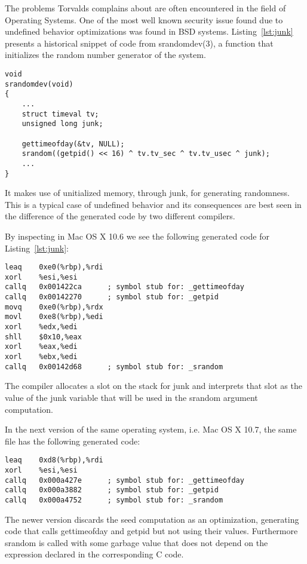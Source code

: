 The problems Torvalds complains about are often encountered in the field
of Operating Systems. One of the most well known security issue found
due to undefined behavior optimizations was found in BSD systems.
Listing~\ref{lst:junk} presents a historical snippet of code from
srandomdev(3), a function that initializes the random number generator
of the system.

\begin{lstlisting}[style=Cstyle, caption={srandom function in
lib/libc/stdlib/random.c on BSD systems}, label={lst:junk}]
void
srandomdev(void)
{
	...
	struct timeval tv;
	unsigned long junk;

	gettimeofday(&tv, NULL);
	srandom((getpid() << 16) ^ tv.tv_sec ^ tv.tv_usec ^ junk);
	...
}
\end{lstlisting}

It makes use of unitialized memory, through junk, for generating
randomness. This is a typical case of undefined behavior and its
consequences are best seen in the difference of the generated code by
two different compilers.

By inspecting  in Mac OS X 10.6 we see
the following generated code for Listing~\ref{lst:junk}:
\begin{lstlisting}[style=Cstyle, caption={}, label={lst:junk}]
leaq    0xe0(%rbp),%rdi
xorl    %esi,%esi
callq   0x001422ca      ; symbol stub for: _gettimeofday
callq   0x00142270      ; symbol stub for: _getpid
movq    0xe0(%rbp),%rdx
movl    0xe8(%rbp),%edi
xorl    %edx,%edi
shll    $0x10,%eax
xorl    %eax,%edi
xorl    %ebx,%edi
callq   0x00142d68      ; symbol stub for: _srandom
\end{lstlisting}

The compiler allocates a slot on the stack for junk and interprets that
slot as the value of the junk variable that will be used in the srandom
argument computation. 

In the next version of the same operating system, i.e. Mac OS X 10.7,
the same file has the following generated code:
\begin{lstlisting}[style=Cstyle, caption={}, label={lst:junk}]
leaq    0xd8(%rbp),%rdi
xorl    %esi,%esi
callq   0x000a427e      ; symbol stub for: _gettimeofday
callq   0x000a3882      ; symbol stub for: _getpid
callq   0x000a4752      ; symbol stub for: _srandom
\end{lstlisting}

The newer version discards the seed computation as an optimization,
generating code that calls gettimeofday and getpid but not using their
values. Furthermore srandom is called with some garbage value that does
not depend on the expression declared in the corresponding C code.

